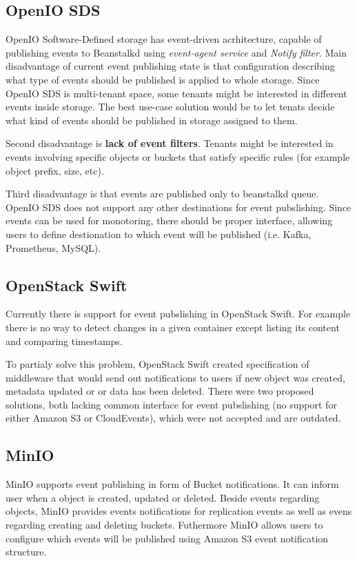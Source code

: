     \subsection{OpenIO SDS}
    OpenIO Software-Defined storage has event-driven acrhitecture, capable of publishing events to Beanstalkd using \textit{event-agent service} and \textit{Notify filter}.
    Main disadvantage of current event publishing state is that configuration describing what type of events should be published is applied to whole storage. Since OpenIO SDS is multi-tenant space, some tenants might be interested in different events inside storage. The best use-case solution would be to let tenats decide what kind of events should be published in storage assigned to them.

    Second disadvantage is \textbf{lack of event filters}. Tenants might be interested in events involving specific objects or buckets that satisfy specific rules (for example object prefix, size, etc).

    Third disadvantage is that events are published only to beanstalkd queue. OpenIO SDS does not support any other destinations for event pubslishing. Since events can be used for monotoring, there should be proper interface, allowing users to define destionation to which event will be published (i.e. Kafka, Prometheus, MySQL).

    \subsection{OpenStack Swift}
    Currently there is support for event pubslishing in OpenStack Swift. For example there is no way to detect changes in a given container except listing its content and comparing timestamps.

    To partialy solve this problem, OpenStack Swift created specification of middleware that would send out notifications to users if new object was created, metadata updated or or data has been deleted.
    There were two proposed solutions, both lacking common interface for event pubslishing (no support for either Amazon S3 or CloudEvents), which were not accepted and are outdated.

    \subsection{MinIO}
    MinIO supports event publishing in form of Bucket notifications. It can inform user when a object is created, updated or deleted. Beside events regarding objects, MinIO provides events notifications for replication events as well as evens regarding creating and deleting buckets. Futhermore MinIO allows users to configure which events will be published using Amazon S3 event notification structure.

